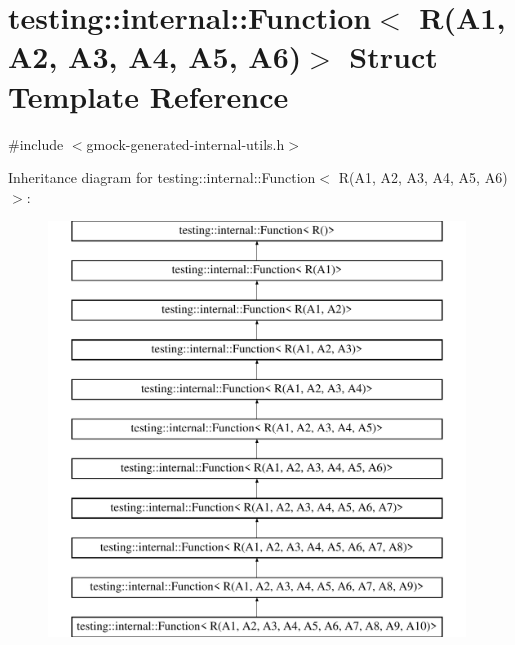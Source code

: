 \hypertarget{structtesting_1_1internal_1_1Function_3_01R_07A1_00_01A2_00_01A3_00_01A4_00_01A5_00_01A6_08_4}{}\section{testing\+::internal\+::Function$<$ R(A1, A2, A3, A4, A5, A6)$>$ Struct Template Reference}
\label{structtesting_1_1internal_1_1Function_3_01R_07A1_00_01A2_00_01A3_00_01A4_00_01A5_00_01A6_08_4}


{\ttfamily \#include $<$gmock-\/generated-\/internal-\/utils.\+h$>$}

Inheritance diagram for testing\+::internal\+::Function$<$ R(A1, A2, A3, A4, A5, A6)$>$\+:\begin{figure}[H]
\begin{center}
\leavevmode
\includegraphics[height=11.000000cm]{structtesting_1_1internal_1_1Function_3_01R_07A1_00_01A2_00_01A3_00_01A4_00_01A5_00_01A6_08_4}
\end{center}
\end{figure}
